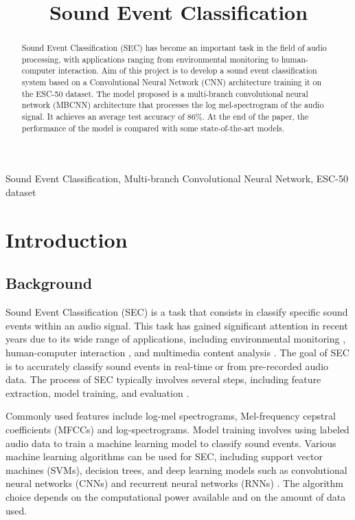 \documentclass{article}
\title{Sound Event Classification}
\begin{document}
\ninept
\maketitle

\begin{sloppy}

\begin{abstract}
  Sound Event Classification (SEC) has become an important task in the field of
  audio processing, with applications ranging from environmental monitoring to
  human-computer interaction. Aim of this project is to develop a sound event classification system
  based on a Convolutional Neural Network (CNN) architecture training it on the ESC-50 dataset.
  The model proposed is a multi-branch convolutional neural network (MBCNN) architecture that
  processes the log mel-spectrogram of the audio signal. It achieves an average test accuracy of 86\%.
  At the end of the paper, the performance of the model is compared with
  some state-of-the-art models. 
\end{abstract}

\begin{keywords}
Sound Event Classification, Multi-branch Convolutional Neural Network, ESC-50 dataset
\end{keywords}

\section{Introduction}
\label{sec:intro}

\subsection{Background}
\label{sec:background}
Sound Event Classification (SEC) is a task that consists in classify
specific sound events within an audio signal. This task has gained significant attention in recent years
due to its wide range of applications, including environmental monitoring \cite{birdsCNN2017}, human-computer interaction \cite{emotionRecognition2021},
and multimedia content analysis \cite{kumar2016weaklysupervisedscalableaudio}.
The goal of SEC is to accurately classify sound events in real-time or from pre-recorded audio data.
The process of SEC typically involves several steps, including feature extraction, model training, and evaluation \cite{ReviewSoundEvent2025}.

Commonly used features include log-mel spectrograms, Mel-frequency cepstral coefficients (MFCCs) and log-spectrograms.
Model training involves using labeled audio data to train a machine learning model to classify sound events.
Various machine learning algorithms can be used for SEC, including support vector machines (SVMs), decision trees, and deep
learning models such as convolutional neural networks (CNNs) and recurrent neural networks (RNNs) \cite{DescriptiveESC2022}.
The algorithm choice depends on the computational power available and on the amount of data used.


\end{sloppy}
\end{document}
